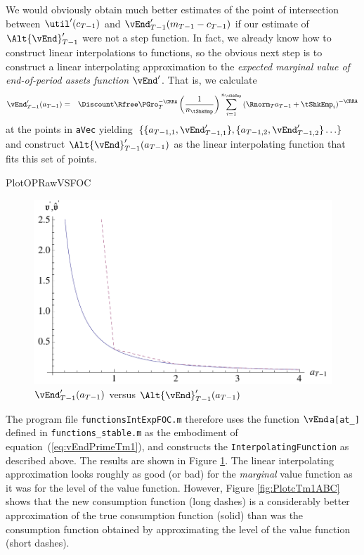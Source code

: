 \documentclass[titlepage]{\econtex}
\begin{document}
We would obviously obtain much better estimates of the point of
intersection between $\util^{\prime}({c}_{T-1})$ and
$\vEnd_{T-1}^{\prime}({m}_{T-1}-{c}_{T-1})$ if our estimate of
$\Alt{\vEnd}^{\prime}_{T-1}$ were not a step function.  In
fact, we already know how to construct linear interpolations
to functions, so the obvious next step is to construct a
linear interpolating approximation to the \textit{expected marginal
value of end-of-period assets function} $\vEnd^{\prime}$. That is, we calculate
\begin{eqnarray}
        \vEnd_{T-1}^{\prime}({a}_{T-1}) & = &  \Discount \Rfree \PGro_{T}^{-\CRRA} \left(\frac{1}{n_{\tShkEmp}}\right) \sum_{i=1}^{n_{\tShkEmp}} \left(\Rnorm_{T} {a}_{T-1} + \tShkEmp_{i}\right)^{-\CRRA} \label{eq:vEndPrimeTm1}
\end{eqnarray}
at the points in \texttt{aVec} yielding
$\{\{\null{a}_{T-1,1},\vEnd_{T-1,1}^{\prime}\},\{{a}_{T-1,2},\vEnd_{T-1,2}^{\prime}\}
\ldots\}$ and construct
$\Alt{\vEnd}_{T-1}^{\prime}({a}_{T-1})$ as the linear
interpolating function that fits this set of points.

\hypertarget{}{PlotOPRawVSFOC}{}
\begin{figure}
        \includegraphics{./Figures/PlotOPRawVSFOC}
        \caption{$\vEnd_{T-1}^{\prime}({a}_{T-1})$ versus $\Alt{\vEnd}_{T-1}^{\prime}({a}_{T-1})$}
        \label{fig:PlotOPRawVSFOC}
\end{figure}


The program file \texttt{functionsIntExpFOC.m} therefore
uses the function \texttt{$\vEnd$a[at\_]} defined in \texttt{functions\_stable.m}
as the embodiment of equation~(\ref{eq:vEndPrimeTm1}), and constructs the
\texttt{InterpolatingFunction} as described above.  The results are
shown in Figure \ref{fig:PlotOPRawVSFOC}.  The linear
interpolating approximation looks roughly as good (or bad) for the
\textit{marginal} value function as it was for the level of the value
function. However, Figure \ref{fig:PlotcTm1ABC} shows that the new
consumption function (long dashes) is a considerably better
approximation of the true consumption function (solid) than was the
consumption function obtained by approximating the level of the
value function (short dashes).
\end{document}
